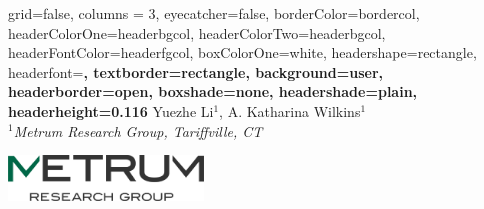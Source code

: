 \documentclass[portrait,fontscale=0.3,paperwidth=36in,paperheight=48in]{baposter}
\begin{document}

\background{
}

\begin{poster}{
	grid=false,
	columns = 3,
	eyecatcher=false, 
	borderColor=bordercol,
	headerColorOne=headerbgcol,
	headerColorTwo=headerbgcol,
	headerFontColor=headerfgcol,
	boxColorOne=white,
	headershape=rectangle,
	headerfont=\Large\bf\textsf,
	textborder=rectangle,
	background=user,
	headerborder=open,
  boxshade=none, 
  headershade=plain,
  headerheight=0.116\textheight %
}
{
}
{\smaller
	\textbf{\textsf{\color{titlefgcol}{ 
		Towards the development of a platform PBPK-QSP model in the Julia programming language for evaluating potential toxicities caused by antibody-drug-conjugate therapies
	 }}}\vspace{.5em}
}
{\smaller  \smaller 
	Yuezhe Li$^1$, A. Katharina Wilkins$^1$  \\
	{\smaller  
	  $^1$\textit{Metrum Research Group, Tariffville, CT}
	}
}
{
		\begin{minipage}{16em}
			\begin{center}
			\includegraphics[width=14em]{newlogo} 
			\end{center}
		\end{minipage}
}



\end{poster}
\end{document}
